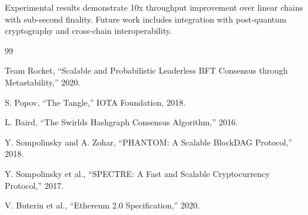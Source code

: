 \documentclass[11pt,a4paper]{article}
\begin{document}
Experimental results demonstrate 10x throughput improvement over linear chains with sub-second finality. Future work includes integration with post-quantum cryptography and cross-chain interoperability.

\begin{thebibliography}{99}

Team Rocket, ``Scalable and Probabilistic Leaderless BFT Consensus through Metastability,'' 2020.

S. Popov, ``The Tangle,'' IOTA Foundation, 2018.

L. Baird, ``The Swirlds Hashgraph Consensus Algorithm,'' 2016.

Y. Sompolinsky and A. Zohar, ``PHANTOM: A Scalable BlockDAG Protocol,'' 2018.

Y. Sompolinsky et al., ``SPECTRE: A Fast and Scalable Cryptocurrency Protocol,'' 2017.

V. Buterin et al., ``Ethereum 2.0 Specification,'' 2020.

\end{thebibliography}
\end{document}
